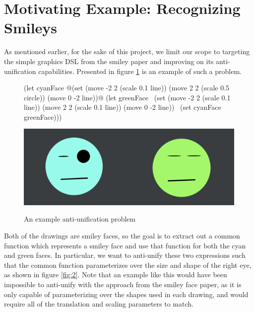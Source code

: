 \documentclass[acmsmall,nonacm]{acmart}\settopmatter{}
\begin{document}
\section{Motivating Example: Recognizing Smileys}

As mentioned earlier, for the sake of this project, we limit our scope to targeting the simple graphics DSL from the smiley paper and improving on its anti-unification capabilities. Presented in figure \ref{fig:1} is an example of such a problem.

\begin{figure}[h]
  \begin{minipage}[c]{.5\linewidth}
    \centering
    
    \begin{nanoml}[xleftmargin=.175\textwidth]
(let cyanFace @(set
  (move -2 2 (scale 0.1 line))
  (move 2 2 (scale 0.5 circle))
  (move 0 -2 line))@
  (let greenFace ~(set
    (move -2 2 (scale 0.1 line))
    (move 2 2 (scale 0.1 line))
    (move 0 -2 line))~
      (set cyanFace greenFace)))
    \end{nanoml}
    \label{fig:1a}
  \end{minipage}%
  \begin{minipage}[c]{.5\linewidth}
    \centering
    \includegraphics[width=.75\linewidth]{bruh}
    \label{fig:1b}
  \end{minipage}
  \vspace{2em}
  \caption{An example anti-unification problem}\label{fig:1}
  \vspace{0.5em}
\end{figure}

Both of the drawings are smiley faces, so the goal is to extract out a common function which represents a smiley face and use that function for both the cyan and green faces. In particular, we want to anti-unify these two expressions such that the common function parameterizes over the size and shape of the right eye, as shown in figure \ref{fig:2}. Note that an example like this would have been impossible to anti-unify with the approach from the smiley face paper, as it is only capable of parameterizing over the shapes used in each drawing, and would require all of the translation and scaling parameters to match.
\end{document}
